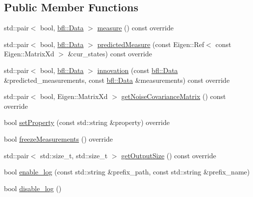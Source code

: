 \subsection*{Public Member Functions}
\begin{DoxyCompactItemize}
\item 
std\+::pair$<$ bool, \mbox{\hyperlink{namespacebfl_af6b103c6821db1b54452f776fdd9dd02}{bfl\+::\+Data}} $>$ \mbox{\hyperlink{classbfl_1_1MeasurementModelDecorator_a36194c2f6abd7e13a417c3663febe921}{measure}} () const override
\item 
std\+::pair$<$ bool, \mbox{\hyperlink{namespacebfl_af6b103c6821db1b54452f776fdd9dd02}{bfl\+::\+Data}} $>$ \mbox{\hyperlink{classbfl_1_1MeasurementModelDecorator_ae4b5f665c511cb0fddaaf0a3de402f22}{predicted\+Measure}} (const Eigen\+::\+Ref$<$ const Eigen\+::\+Matrix\+Xd $>$ \&cur\+\_\+states) const override
\item 
std\+::pair$<$ bool, \mbox{\hyperlink{namespacebfl_af6b103c6821db1b54452f776fdd9dd02}{bfl\+::\+Data}} $>$ \mbox{\hyperlink{classbfl_1_1MeasurementModelDecorator_af2c4f2057a721f77d02fc54498136d47}{innovation}} (const \mbox{\hyperlink{namespacebfl_af6b103c6821db1b54452f776fdd9dd02}{bfl\+::\+Data}} \&predicted\+\_\+measurements, const \mbox{\hyperlink{namespacebfl_af6b103c6821db1b54452f776fdd9dd02}{bfl\+::\+Data}} \&measurements) const override
\item 
std\+::pair$<$ bool, Eigen\+::\+Matrix\+Xd $>$ \mbox{\hyperlink{classbfl_1_1MeasurementModelDecorator_a690917b537b72bd6278968bbd5b030b0}{get\+Noise\+Covariance\+Matrix}} () const override
\item 
bool \mbox{\hyperlink{classbfl_1_1MeasurementModelDecorator_a531a891152d7bf83e56370664d54f42f}{set\+Property}} (const std\+::string \&property) override
\item 
bool \mbox{\hyperlink{classbfl_1_1MeasurementModelDecorator_a17d5fb12bfa048ca56160f745f112e32}{freeze\+Measurements}} () override
\item 
std\+::pair$<$ std\+::size\+\_\+t, std\+::size\+\_\+t $>$ \mbox{\hyperlink{classbfl_1_1MeasurementModelDecorator_a9522d1549c62f55a59401f6fa53421e8}{get\+Output\+Size}} () const override
\item 
bool \mbox{\hyperlink{classbfl_1_1Logger_ae94b97b6e8d7902e8ce048384813122e}{enable\+\_\+log}} (const std\+::string \&prefix\+\_\+path, const std\+::string \&prefix\+\_\+name)
\item 
bool \mbox{\hyperlink{classbfl_1_1Logger_a440467a28ccc46490d767fe0ef6f556a}{disable\+\_\+log}} ()
\item 

\end{DoxyCompactItemize}
